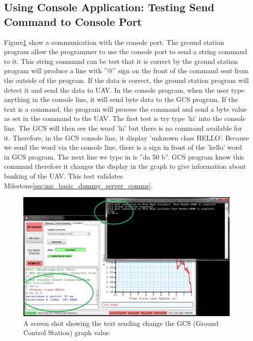 \subsection{Using Console Application: Testing Send Command to Console Port}
\label{sec:send_console}
Figure\ref{test text} show a communication with the console port.
The ground station program allow the programmer to use the console port to send a string command to it. 
This string command can be test that it is correct by the ground station program will produce a line with ''@'' sign on the front of the command sent from the outside of the program.
If the data is correct, the ground station program will detect it and send the data to UAV. 
In the console program, when the user type anything in the console line, it will send byte data to the GCS program.
If the text is a command, the program will process the command and send a byte value as set in the command to the UAV.
The first test is try type 'hi' into the console line.
The GCS will then see the word 'hi' but there is no command available for it.
Therefore, in the GCS console line, it display 'unknown class HELLO'.
Because we send the word via the console line, there is a \@ sign in front of the 'hello' word in GCS program.
The next line we type in is ''da 50 b''.
GCS program know this command therefore it changes the display in the graph to give information about banking of the UAV.
This test validates Milestone\ref{sec:ms_basic_dummy_server_comms}.
\begin{figure}[H]
\begin{center}
\includegraphics[width=1.00\textwidth]{testing_screenshots/test_sending_test_text_useful.png} 
\end{center}
\caption{A screen shot showing the text sending change the GCS (Ground Control Station) graph value\label{test text}}
\end{figure}

